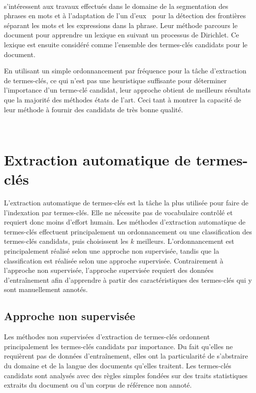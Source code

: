     ~\\ s'intéressent aux travaux
    effectués dans le domaine de la segmentation des phrases en mots et à
    l'adaptation de l'un d'eux~\cite{goldwater2009bayesianwordsegmentation} pour
    la détection des frontières séparant les mots et les expressions dans la
    phrase. Leur méthode parcours le document pour apprendre un lexique en
    suivant un processus de Dirichlet. Ce lexique est ensuite considéré comme
    l'ensemble des termes-clés candidats pour le document.

    En utilisant un simple ordonnancement par fréquence pour la tâche
    d'extraction de termes-clés, ce qui n'est pas une heuristique suffisante
    pour déterminer l'importance d'un terme-clé candidat, leur approche obtient
    de meilleurs résultats que la majorité des méthodes états de l'art. Ceci
    tant à montrer la capacité de leur méthode à fournir des candidats de très
    bonne qualité.

    ~\\


  \section{Extraction automatique de termes-clés}
  \label{sec:main-state_of_the_art-automatic_keyphrase_extraction}
    L'extraction automatique de termes-clés est la tâche la plus utilisée pour
    faire de l'indexation par termes-clés. Elle ne nécessite pas de vocabulaire
    contrôlé et requiert donc moins d'effort humain. Les méthodes d'extraction
    automatique de termes-clés effectuent principalement un ordonnancement ou
    une classification des termes-clés candidats, puis choisissent les $k$
    meilleurs. L'ordonnancement est principalement réalisé selon une approche
    non supervisée, tandis que la classification est réalisée selon une approche
    supervisée. Contrairement à l'approche non supervisée, l'approche supervisée
    requiert des données d'entraînement afin d'apprendre à partir des
    caractéristiques des termes-clés qui y sont manuellement annotés.

    \subsection{Approche non supervisée}
    \label{subsec:main-state_of_the_art-automatic_keyphrase_extraction-unsupervised_keyphrase_extraction}
      Les méthodes non supervisées d'extraction de termes-clés ordonnent
      principalement les termes-clés candidats par importance. Du fait qu'elles
      ne requièrent pas de données d'entraînement, elles ont la particularité de
      s'abstraire du domaine et de la langue des documents qu'elles traitent.
      Les termes-clés candidats sont analysés avec des règles simples fondées
      sur des traits statistiques extraits du document ou d'un corpus de
      référence non annoté.

